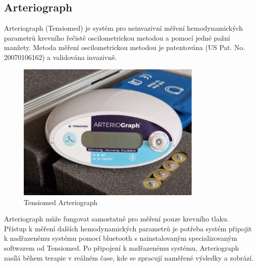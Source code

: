 \subsection{Arteriograph}
Arteriograph (Tensiomed) je systém pro neinvazivní měření hemodynamických parametrů krevního řečistě oscilometrickou metodou a pomocí jedné pažní manžety.
Metoda měření oscilometrickou metodou je patentována (US Pat. No. 20070106162) a validována invazivně.
\begin{figure}[H]
    \caption{Tensiomed Arteriograph \cite{cite:Arteriograph}}
    \includegraphics[width=0.8\textwidth]{pictures/arteriograph.jpg}
\end{figure}
Arteriograph může fungovat samostatně pro měření pouze krevního tlaku. Přístup k měření dalších hemodynamických parametrů je potřeba systém připojit k nadřazenému systému pomocí bluetooth s nainstalovaným specializovaným softwarem od Tensiomed.
Po připojení k nadřazenému systému, Arteriograph zasílá během terapie v reálném čase, kde se zpracují naměřené výsledky a zobrází.
\cite{cite:Arteriograph}

